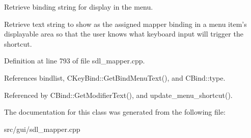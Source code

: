 Retrieve binding string for display in the menu. 

Retrieve text string to show as the assigned mapper binding in a menu item's displayable area so that the user knows what keyboard input will trigger the shortcut. 

Definition at line 793 of file sdl\-\_\-mapper.\-cpp.



References bindlist, C\-Key\-Bind\-::\-Get\-Bind\-Menu\-Text(), and C\-Bind\-::type.



Referenced by C\-Bind\-::\-Get\-Modifier\-Text(), and update\-\_\-menu\-\_\-shortcut().



The documentation for this class was generated from the following file\-:\begin{DoxyCompactItemize}
\item 
src/gui/sdl\-\_\-mapper.\-cpp\end{DoxyCompactItemize}
